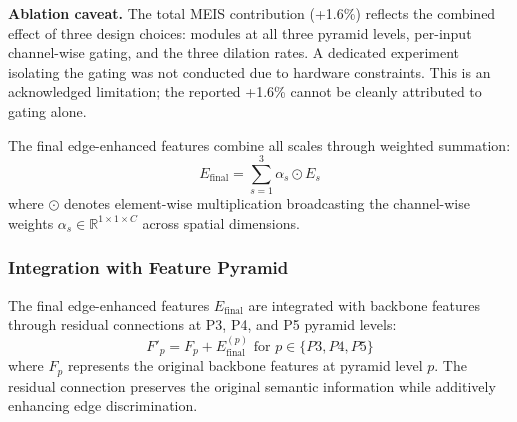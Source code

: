 \documentclass[preprint,12pt]{elsarticle}
\begin{document}
\textbf{Ablation caveat.} The total MEIS contribution (+1.6\%) reflects the
combined effect of three design choices: modules at all three pyramid levels,
per-input channel-wise gating, and the three dilation rates. A dedicated
experiment isolating the gating was not conducted due to hardware constraints.
This is an acknowledged limitation; the reported +1.6\% cannot be cleanly
attributed to gating alone.

The final edge-enhanced features combine all scales through weighted summation:
\begin{equation}
E_{\text{final}} = \sum_{s=1}^{3} \alpha_s \odot E_s
\end{equation}
where $\odot$ denotes element-wise multiplication broadcasting the channel-wise
weights $\alpha_s \in \mathbb{R}^{1 \times 1 \times C}$ across spatial dimensions.

\subsubsection{Integration with Feature Pyramid}

The final edge-enhanced features $E_{\text{final}}$ are integrated with backbone
features through residual connections at P3, P4, and P5 pyramid levels:
\begin{equation}
F'_p = F_p + E_{\text{final}}^{(p)} \text{ for } p \in \{P3, P4, P5\}
\end{equation}
where $F_p$ represents the original backbone features at pyramid level $p$. The
residual connection preserves the original semantic information while additively
enhancing edge discrimination.
\end{document}
